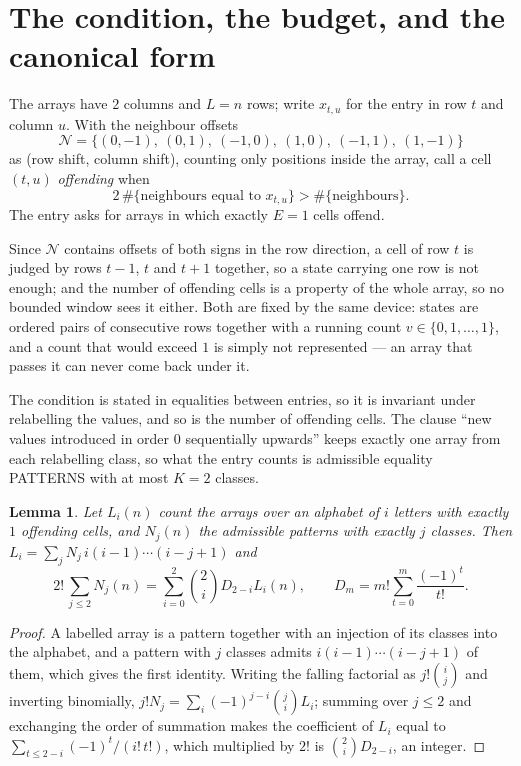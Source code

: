 \documentclass[11pt,a4paper]{article}
\theoremstyle{plain}
\newtheorem{lemma}[theorem]{Lemma}
\theoremstyle{definition}
\begin{document}
\section{The condition, the budget, and the canonical form}

The arrays have $2$ columns and $L=n$ rows; write $x_{t,u}$ for the entry in
row $t$ and column $u$. With the neighbour offsets
\[
\mathcal N=\{(0,-1),\ (0,1),\ (-1,0),\ (1,0),\ (-1,1),\ (1,-1)\}
\]
as (row shift, column shift), counting only positions inside the array, call a cell
$(t,u)$ \emph{offending} when
\[
2\,\#\{\text{neighbours equal to }x_{t,u}\}>\#\{\text{neighbours}\} .
\]
The entry asks for arrays in which exactly $E=1$ cells offend.

Since $\mathcal N$ contains offsets of both signs in the row direction, a cell of row
$t$ is judged by rows $t-1$, $t$ and $t+1$ together, so a state carrying one row is not
enough; and the number of offending cells is a property of the whole array, so no bounded
window sees it either. Both are fixed by the same device: states are ordered pairs of
consecutive rows together with a running count $v\in\{0,1,\dots,1\}$, and a count that
would exceed $1$ is simply not represented --- an array that passes it can never come back
under it.

The condition is stated in equalities between entries, so it is invariant under relabelling
the values, and so is the number of offending cells. The clause ``new values introduced in
order $0$ sequentially upwards'' keeps exactly one array from each relabelling class, so what
the entry counts is admissible equality PATTERNS with at most $K=2$ classes.

\begin{lemma}\label{lem:inv}
Let $L_i(n)$ count the arrays over an alphabet of $i$ letters with exactly $1$ offending
cells, and $N_j(n)$ the admissible patterns with exactly $j$ classes. Then
$L_i=\sum_j N_j\,i(i-1)\cdots(i-j+1)$ and
\[
2!\,\sum_{j\le2}N_j(n)=\sum_{i=0}^{2}\binom{2}{i}D_{2-i}L_i(n),
\qquad D_m=m!\sum_{t=0}^{m}\frac{(-1)^t}{t!} .
\]
\end{lemma}

\begin{proof}
A labelled array is a pattern together with an injection of its classes into the alphabet,
and a pattern with $j$ classes admits $i(i-1)\cdots(i-j+1)$ of them, which gives the first
identity. Writing the falling factorial as $j!\binom{i}{j}$ and inverting binomially,
$j!N_j=\sum_i(-1)^{j-i}\binom{j}{i}L_i$; summing over $j\le2$ and exchanging the
order of summation makes the coefficient of $L_i$ equal to
$\sum_{t\le2-i}(-1)^t/(i!\,t!)$, which multiplied by $2!$ is
$\binom{2}{i}D_{2-i}$, an integer.
\end{proof}
\end{document}
